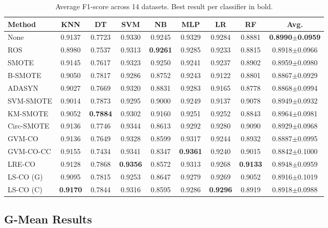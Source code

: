 \begin{table}[H]
\centering
\caption{Average F1-score across 14 datasets. Best result per classifier in bold.}
\label{tab:results:f1}
\small
\begin{tabular}{lcccccccc}
\toprule
\textbf{Method} & \textbf{KNN} & \textbf{DT} & \textbf{SVM} & \textbf{NB} & \textbf{MLP} & \textbf{LR} & \textbf{RF} & \textbf{Avg.} \\
\midrule
None       & 0.9137 & 0.7723 & 0.9330 & 0.9245 & 0.9329 & 0.9284 & 0.8881 & \textbf{0.8990$\pm$0.0959} \\
ROS        & 0.8980 & 0.7537 & 0.9313 & \textbf{0.9261} & 0.9285 & 0.9233 & 0.8815 & 0.8918$\pm$0.0966 \\
SMOTE      & 0.9145 & 0.7617 & 0.9323 & 0.9250 & 0.9241 & 0.9237 & 0.8902 & 0.8959$\pm$0.0980 \\
B-SMOTE    & 0.9050 & 0.7817 & 0.9286 & 0.8752 & 0.9243 & 0.9122 & 0.8801 & 0.8867$\pm$0.0929 \\
ADASYN     & 0.9027 & 0.7669 & 0.9320 & 0.8831 & 0.9283 & 0.9165 & 0.8778 & 0.8868$\pm$0.0994 \\
SVM-SMOTE  & 0.9014 & 0.7873 & 0.9295 & 0.9000 & 0.9249 & 0.9137 & 0.9078 & 0.8949$\pm$0.0932 \\
KM-SMOTE   & 0.9052 & \textbf{0.7884} & 0.9302 & 0.9160 & 0.9251 & 0.9252 & 0.8843 & 0.8964$\pm$0.0981 \\
Circ-SMOTE & 0.9136 & 0.7746 & 0.9344 & 0.8613 & 0.9292 & 0.9280 & 0.9090 & 0.8929$\pm$0.0968 \\
\midrule
GVM-CO     & 0.9136 & 0.7649 & 0.9328 & 0.8599 & 0.9317 & 0.9244 & 0.8932 & 0.8887$\pm$0.0995 \\
GVM-CO-CC  & 0.9155 & 0.7434 & 0.9341 & 0.8347 & \textbf{0.9361} & 0.9240 & 0.9015 & 0.8842$\pm$0.1000 \\
LRE-CO     & 0.9128 & 0.7868 & \textbf{0.9356} & 0.8572 & 0.9313 & 0.9268 & \textbf{0.9133} & 0.8948$\pm$0.0959 \\
LS-CO (G)  & 0.9095 & 0.7815 & 0.9253 & 0.8647 & 0.9279 & 0.9269 & 0.9052 & 0.8916$\pm$0.1019 \\
LS-CO (C)  & \textbf{0.9170} & 0.7844 & 0.9316 & 0.8595 & 0.9286 & \textbf{0.9296} & 0.8919 & 0.8918$\pm$0.0988 \\
\bottomrule
\end{tabular}
\end{table}

\subsection{G-Mean Results}

